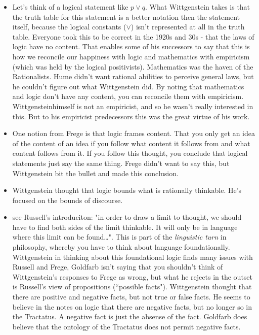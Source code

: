 \documentclass[12pt]{article}
\theoremstyle{definition}
\begin{document}
\begin{itemize}
    \item Let's think of a logical statement like $p \vee q$. What Wittgenstein takes is that the truth table for this statement is a better notation then the statement itself, because the logical constants ($\vee$) isn't represented at all in the truth table. Everyone took this to be correct in the 1920s and 30s - that the laws of logic have no content. That enables some of his successors to say that this is how we reconcile our happiness with logic and mathematics with empiricism (which was held by the logical positivists). Mathematics was the haven of the Rationalists. Hume didn't want rational abilities to perceive general laws, but he couldn't figure out what Wittgenstein did. By noting that mathematics and logic don't have any content, you can reconcile them with empiricism. Wittgensteinhimself is not an empiricist, and so he wasn't really interested in this. But to his empiricist predecessors this was the great virtue of his work.
    \item  One notion from Frege is that logic frames content. That you only get an idea of the content of an idea if you follow what content it follows from and what content follows from it. If you follow this thought, you conclude that logical statements just say the same thing. Frege didn't want to say this, but Wittgenstein bit the bullet and made this conclusion. 
    \item Wittgenstein thought that logic bounds what is rationally thinkable. He's focused on the bounds of discourse.
    \item see Russell's introduciton: "in order to draw a limit to thought, we should have to find both sides of the limit thinkable. It will only be in language where this limit can be found\ldots". This is part of the \textit{linguistic turn} in philosophy, whereby you have to think about language foundationally. Wittgenstein in thinking about this foundational logic finds many issues with Russell and Frege, Goldfarb isn't saying that you shouldn't think of Wittgenstein's responses to Frege as wrong, but what he rejects in the outset is Russell's view of propositions (``possible facts"). Wittgenstein thought that there are positive and negative facts, but not true or false facts. He seems to believe in the notes on logic that there are negative facts, but no longer so in the Tractatus. A negative fact is just the absense of the fact. Goldfarb does believe that the ontology of the Tractatus does not permit negative facts.

\end{itemize}
\end{document}
